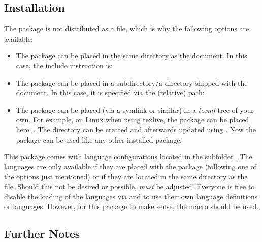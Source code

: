 \documentclass{sopra-base}
\begin{document}
\subsection{Installation}
    The package is not distributed as a  file, which is why the
    following options are available:
    \begin{itemize}
        \item The package can be placed in the same directory as the document.
                In this case, the include instruction is:
\begin{plainlatex}
\usepackage{sopra-listings}
\end{plainlatex}
        \item The package can be placed in a subdirectory/a directory
                shipped with the document. In
                this case, it is specified via the (relative) path:
\begin{plainlatex}
\usepackage{./My/Path/to/sopra-listings}
\end{plainlatex}
        \item The package can be placed (via a symlink or similar)
              in a \emph{texmf} tree of your own.
              For example, on Linux when using texlive,
              the package can be placed here: .
              The directory can be created and afterwards updated using
              . Now
              the package can be used like any other installed package:
\begin{plainlatex}
\usepackage{sopra-listings}
\end{plainlatex}
    \end{itemize}

     This package comes with language configurations located in the subfolder . The languages are only available
    if they are placed with the package (following one of the options just mentioned) or if they are located in the same directory as the \LaTeXe{} file. Should this
    not be desired or possible,  \emph{must} be adjusted! Everyone is free to disable the loading of the languages via  and to use their own language definitions
    or languages. However, for this package to make sense, the  macro should be used.

\subsection{Further Notes}
\end{document}
